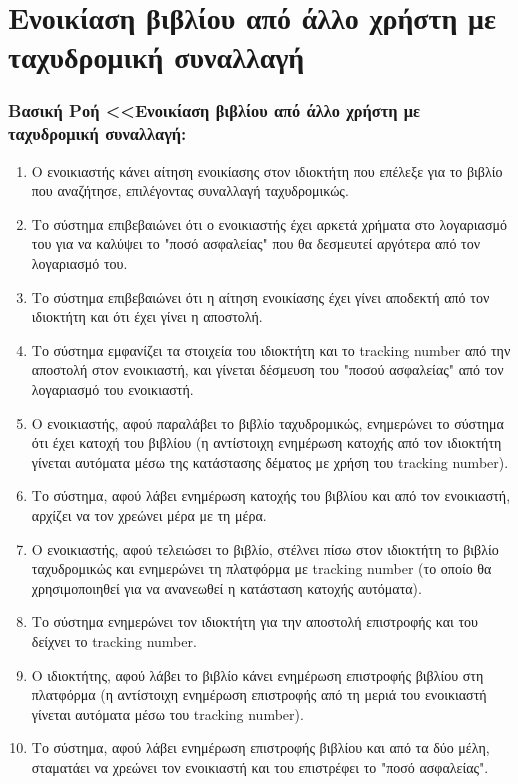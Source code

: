\documentclass[12pt,a4paper]{article}
\begin{document}
\section{Ενοικίαση βιβλίου από άλλο χρήστη με ταχυδρομική συναλλαγή}
\subsubsection*{Βασική Ροή <<Ενοικίαση βιβλίου από άλλο χρήστη με ταχυδρομική συναλλαγή:}
\begin{enumerate}
    \item Ο ενοικιαστής κάνει αίτηση ενοικίασης στον ιδιοκτήτη που επέλεξε για το βιβλίο που αναζήτησε, επιλέγοντας συναλλαγή ταχυδρομικώς.
    \item Το σύστημα επιβεβαιώνει ότι ο ενοικιαστής έχει αρκετά χρήματα στο λογαριασμό του για να καλύψει το "ποσό ασφαλείας" που θα δεσμευτεί αργότερα από τον λογαριασμό του.
    \item Το σύστημα επιβεβαιώνει ότι η αίτηση ενοικίασης έχει γίνει αποδεκτή από τον ιδιοκτήτη και ότι έχει γίνει η αποστολή.
    \item Το σύστημα εμφανίζει τα στοιχεία του ιδιοκτήτη και το tracking number από την αποστολή στον ενοικιαστή, και γίνεται δέσμευση του "ποσού ασφαλείας" από τον λογαριασμό του ενοικιαστή.
    \item Ο ενοικιαστής, αφού παραλάβει το βιβλίο ταχυδρομικώς, ενημερώνει το σύστημα ότι έχει κατοχή του βιβλίου (η αντίστοιχη ενημέρωση κατοχής από τον ιδιοκτήτη γίνεται αυτόματα μέσω της κατάστασης δέματος με χρήση του tracking number).
    \item Το σύστημα, αφού λάβει ενημέρωση κατοχής του βιβλίου και από τον ενοικιαστή, αρχίζει να τον χρεώνει μέρα με τη μέρα.
    \item Ο ενοικιαστής, αφού τελειώσει το βιβλίο, στέλνει πίσω στον ιδιοκτήτη το βιβλίο ταχυδρομικώς και ενημερώνει τη πλατφόρμα με tracking number (το οποίο θα χρησιμοποιηθεί για να ανανεωθεί η κατάσταση κατοχής αυτόματα).
    \item Το σύστημα ενημερώνει τον ιδιοκτήτη για την αποστολή επιστροφής και του δείχνει το tracking number.
    \item Ο ιδιοκτήτης, αφού λάβει το βιβλίο κάνει ενημέρωση επιστροφής βιβλίου στη πλατφόρμα (η αντίστοιχη ενημέρωση επιστροφής από τη μεριά του ενοικιαστή γίνεται αυτόματα μέσω του tracking number).
    \item Το σύστημα, αφού λάβει ενημέρωση επιστροφής βιβλίου και από τα δύο μέλη, σταματάει να χρεώνει τον ενοικιαστή και του επιστρέφει το "ποσό ασφαλείας".
\end{enumerate}
\end{document}

